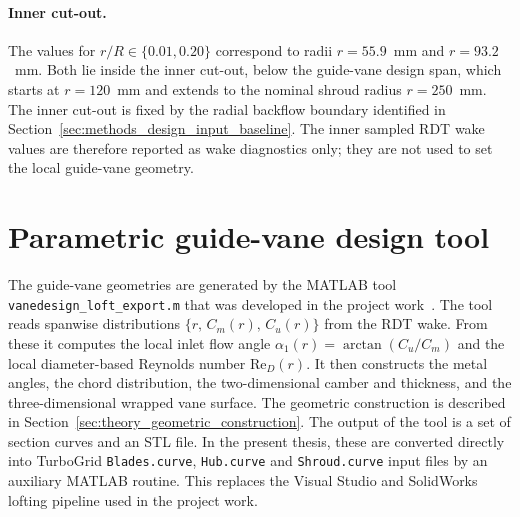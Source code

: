 \paragraph{Inner cut-out.}
The values for $r/R\in\{0.01,0.20\}$ correspond to radii $r=55.9$~mm and $r=93.2$~mm. Both lie inside the inner cut-out, below the guide-vane design span, which starts at $r=120$~mm and extends to the nominal shroud radius $r=250$~mm. The inner cut-out is fixed by the radial backflow boundary identified in Section~\ref{sec:methods_design_input_baseline}. The inner sampled RDT wake values are therefore reported as wake diagnostics only; they are not used to set the local guide-vane geometry.


\section{Parametric guide-vane design tool}
\label{sec:methods_matlab_tool}
 
The guide-vane geometries are generated by the MATLAB tool \texttt{vanedesign\_loft\_export.m} that was developed in the project work~\cite{Leonsen2025}. The tool reads spanwise distributions $\{r,\,C_m(r),\,C_u(r)\}$ from the RDT wake. From these it computes the local inlet flow angle $\alpha_1(r) = \arctan(C_u/C_m)$ and the local diameter-based Reynolds number $\mathrm{Re}_D(r)$. It then constructs the metal angles, the chord distribution, the two-dimensional camber and thickness, and the three-dimensional wrapped vane surface. The geometric construction is described in Section~\ref{sec:theory_geometric_construction}. The output of the tool is a set of section curves and an STL file. In the present thesis, these are converted directly into TurboGrid \texttt{Blades.curve}, \texttt{Hub.curve} and \texttt{Shroud.curve} input files by an auxiliary MATLAB routine. This replaces the Visual Studio and SolidWorks lofting pipeline used in the project work.
 
